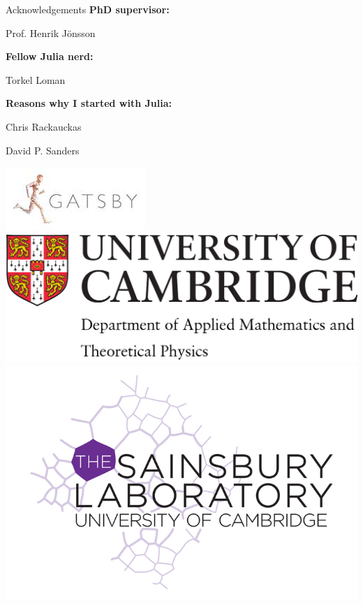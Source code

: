 \documentclass{beamer}
\begin{document}
\begin{frame}{Acknowledgements}
  \textbf{PhD supervisor:}

  Prof. Henrik Jönsson

  \textbf{Fellow Julia nerd:}

  Torkel Loman

  \textbf{Reasons why I started with Julia:}

  Chris Rackauckas

  David P. Sanders


\vspace{4mm}

  \includegraphics[height=0.15\textheight]{gatsby}\hspace{2mm}
  \includegraphics[height=0.15\textheight]{damtp}\hspace{2mm}
  \includegraphics[height=0.15\textheight]{slcu}\hspace{2mm}

\end{frame}
\end{document}
